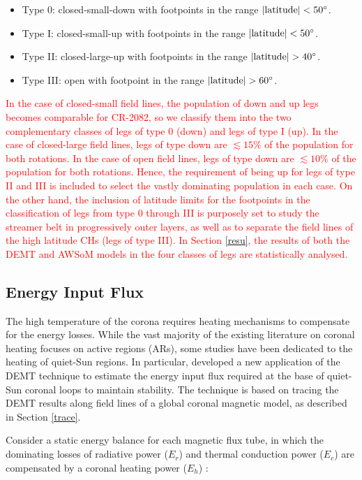 \documentclass[namedreferences]{solarphysics}
\def\edit#1{\textcolor{Red}{#1}}
\newcommand{\mdeg}{^\circ}
\begin{document}
\begin{article}
\begin{itemize}
\item Type 0: closed-small-down with footpoints in the range $|{\rm latitude}|<50\mdeg$. 
\item Type I: closed-small-up with footpoints in the range $|{\rm latitude}|<50\mdeg$. 
\item Type II: closed-large-up with footpoints in the range $|{\rm latitude}|>40\mdeg$. 
\item Type III: open with footpoint in the range $|{\rm latitude}|>60\mdeg$.
\end{itemize}

\edit{In the case of closed-small field lines, the population of down and up legs becomes comparable for CR-2082, so we classify them into the two complementary classes of legs of type 0 (down) and legs of type I (up). In the case of closed-large field lines, legs of type down are $\lesssim 15\%$ of the population for both rotations. In the case of open field lines, legs of type down are $\lesssim 10\%$ of the population for both rotations. Hence, the requirement of being up for legs of type II and III is included to select the vastly dominating population in each case. On the other hand, the inclusion of latitude limits for the footpoints in the classification of legs from type 0 through III is purposely set to study the streamer belt in progressively outer layers, as well as to separate the field lines of the high latitude CHs (legs of type III). In Section \ref{resu}, the results of both the DEMT and AWSoM models in the four classes of legs are statistically analysed.}

\subsection{{Energy Input Flux}}\label{energia} 

{The high temperature of the corona requires heating mechanisms to compensate for the energy losses. While the vast majority of the existing literature on coronal heating focuses on active regions (ARs), some studies have been dedicated to the heating of quiet-Sun regions. In particular, \citet{maccormack_2017} developed a new application of the DEMT technique to estimate the energy input flux required at the base of quiet-Sun coronal loops to maintain stability. The technique is based on tracing the DEMT results along field lines of a global coronal magnetic model, as described in Section \ref{trace}.}

{Consider} a static energy balance for each magnetic flux tube, {in which the dominating losses of} radiative power ($E_r$) and thermal conduction power ($E_c$) are compensated {by a} coronal heating power ($E_h$) \citep{aschwanden_2004}:


\end{article}
\end{document}
